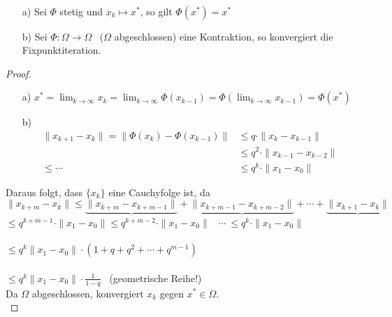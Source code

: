 \begin{lemma}[Konvergenz]
~ %
\begin{enumerate}
\item[a)] Sei $\Phi$ stetig und $x_k \longmapsto x^*$, so gilt $\Phi(x^*)=x^*$\\
\item[b)] Sei $\Phi: \Omega \longrightarrow \Omega$ \ ($\Omega$ abgeschlossen) eine Kontraktion, so konvergiert die Fixpunktiteration.
\end{enumerate}
\end{lemma}

\begin{proof}
~
\begin{enumerate}
\item[a)] $x^*=\lim_{k \to \infty}x_k=\lim_{k \to \infty}\Phi(x_{k-1})=\Phi(\lim_{k \to \infty}x_{k-1})=\Phi(x^*)$
\item[b)]
\begin{align*}
\|x_{k+1}-x_k\| = \|\Phi(x_k)-\Phi(x_{k-1})\| &\leq q\cdot \|x_k-x_{k-1}\| \\
                                              &\leq q^2\cdot \|x_{k-1}-x_{k-2}\| \\
                                   \leq \cdots&\leq q^k\cdot \|x_1-x_0\|
\end{align*}
\end{enumerate}

Daraus folgt, dass $\{x_k\}$ eine Cauchyfolge ist, da
\\$\|x_{k+m}-x_k\|\leq \underbrace{\|x_{k+m}-x_{k+m-1}\|}+\underbrace{\|x_{k+m-1}-x_{k+m-2}\|}+\cdots +\underbrace{\|x_{k+1}-x_k\|}$
\\\hspace*{21mm}$\leq q^{k+m-1}\cdot \|x_1-x_0\|$\hspace*{3mm}$\leq q^{k+m-2}\cdot \|x_1-x_0\|$ \ $\cdots \ \leq q^k\cdot \|x_1-x_0\|$\\
\\\hspace*{21mm}$\leq q^k\|x_1-x_0\| \cdot (1+q+q^2+\cdots +q^{m-1})$\\
\\\hspace*{21mm}$\leq q^k\|x_1-x_0\| \cdot \frac{1}{1-q}$ \ (geometrische Reihe!)
\newline
\\Da $\Omega$ abgeschlossen, konvergiert $x_k$ gegen $x^* \in \Omega$.\\
\end{proof}

